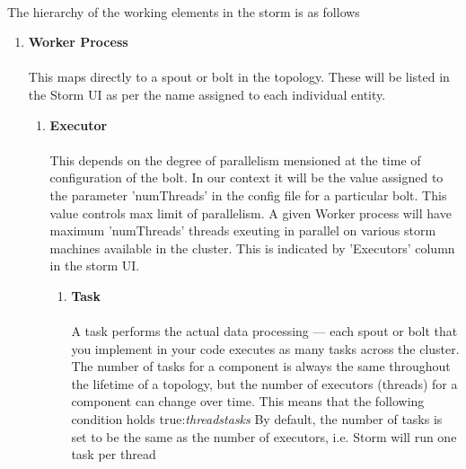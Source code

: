 \documentclass{article}
\begin{document}
    \paragraph{}
    The hierarchy of the working elements in the storm is as follows
    \begin{enumerate}
        \item \textbf{ Worker Process }
        \paragraph{}
        This maps directly to a spout or  bolt in the topology. These will be
        listed in the Storm UI as per the name assigned to each individual
        entity.
        \begin{enumerate}
            \item \textbf{ Executor }
            \paragraph{}
            This depends on the degree of parallelism mensioned at the time of
            configuration of the bolt. In our context it will be the value
            assigned to the parameter 'numThreads' in the config file for a
            particular bolt. This value controls max limit of parallelism. A
            given Worker process will have maximum 'numThreads' threads exeuting
            in parallel on various storm machines available in the cluster. This
            is indicated by 'Executors' column in the storm UI.
            \begin{enumerate}
                \item \textbf{ Task }
                \paragraph{}
                 A task performs the actual data processing — each spout or bolt
                 that you implement in your code executes as many tasks across
                 the cluster. The number of tasks for a component is always the
                 same throughout the lifetime of a topology, but the number of
                 executors (threads) for a component can change over time. This
                 means that the following condition holds true:\emph{threads}\leq \emph{tasks}
                 By default, the number of tasks is set to be the same
                 as the number of executors, i.e. Storm will run one task per
                 thread
            \end{enumerate}
        \end{enumerate}
    \end{enumerate}
\end{document}
